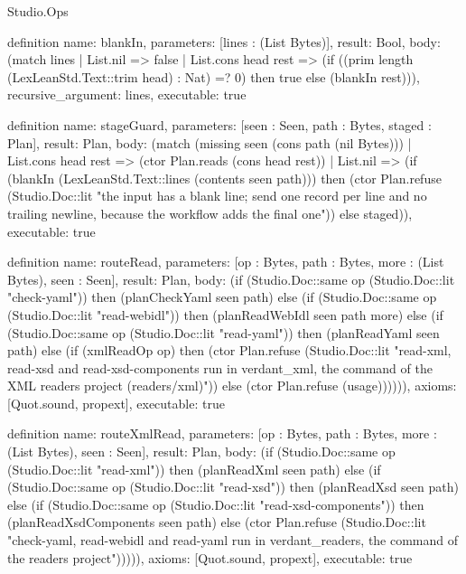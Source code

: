 \begin{lexlean}{Studio.Ops}
\begin{semanticmodule}
{definition{
  name: blankIn,
  parameters: [lines : (List Bytes)],
  result: Bool,
  body: (match lines
    | List.nil => false
    | List.cons head rest => (if ((prim length (LexLeanStd.Text::trim head) : Nat) =? 0) then true else (blankIn rest))),
  recursive_argument: lines,
  executable: true
}

definition{
  name: stageGuard,
  parameters: [seen : Seen, path : Bytes, staged : Plan],
  result: Plan,
  body: (match (missing seen (cons path (nil Bytes)))
    | List.cons head rest => (ctor Plan.reads (cons head rest))
    | List.nil => (if (blankIn (LexLeanStd.Text::lines (contents seen path))) then (ctor Plan.refuse (Studio.Doc::lit "the input has a blank line; send one record per line and no trailing newline, because the workflow adds the final one\n")) else staged)),
  executable: true
}

definition{
  name: routeRead,
  parameters: [op : Bytes, path : Bytes, more : (List Bytes), seen : Seen],
  result: Plan,
  body: (if (Studio.Doc::same op (Studio.Doc::lit "check-yaml")) then (planCheckYaml seen path) else
    (if (Studio.Doc::same op (Studio.Doc::lit "read-webidl")) then (planReadWebIdl seen path more) else
    (if (Studio.Doc::same op (Studio.Doc::lit "read-yaml")) then (planReadYaml seen path) else
    (if (xmlReadOp op) then (ctor Plan.refuse (Studio.Doc::lit "read-xml, read-xsd and read-xsd-components run in verdant_xml, the command of the XML readers project (readers/xml)\n")) else
    (ctor Plan.refuse (usage)))))),
  axioms: [Quot.sound, propext],
  executable: true
}

definition{
  name: routeXmlRead,
  parameters: [op : Bytes, path : Bytes, more : (List Bytes), seen : Seen],
  result: Plan,
  body: (if (Studio.Doc::same op (Studio.Doc::lit "read-xml")) then (planReadXml seen path) else
    (if (Studio.Doc::same op (Studio.Doc::lit "read-xsd")) then (planReadXsd seen path) else
    (if (Studio.Doc::same op (Studio.Doc::lit "read-xsd-components")) then (planReadXsdComponents seen path) else
    (ctor Plan.refuse (Studio.Doc::lit "check-yaml, read-webidl and read-yaml run in verdant_readers, the command of the readers project\n"))))),
  axioms: [Quot.sound, propext],
  executable: true
}

}
\end{semanticmodule}
\end{lexlean}
